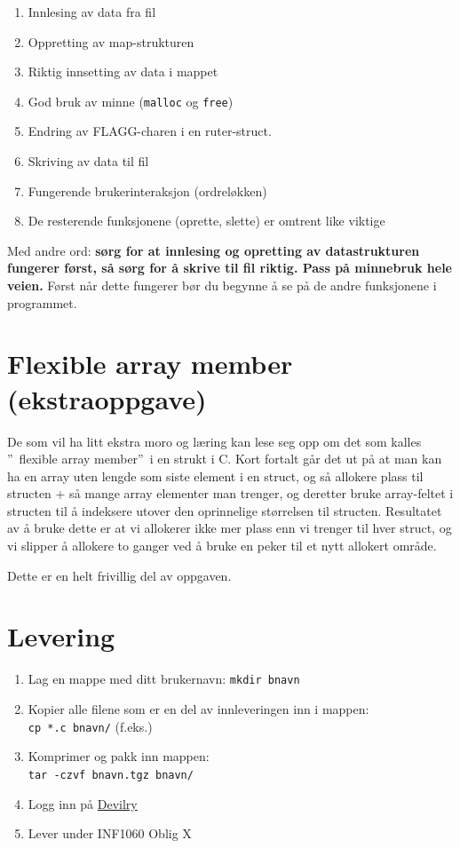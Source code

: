\documentclass[norsk]{article}
\begin{document}
\begin{enumerate}
    \item Innlesing av data fra fil
    \item Oppretting av map-strukturen
    \item Riktig innsetting av data i mappet
    \item God bruk av minne (\texttt{malloc} og \texttt{free})
    \item Endring av FLAGG-charen i en ruter-struct.
    \item Skriving av data til fil
    \item Fungerende brukerinteraksjon (ordreløkken)
    \item De resterende funksjonene (oprette, slette) er omtrent like viktige
\end{enumerate}

Med andre ord: \textbf{sørg for at innlesing og opretting av datastrukturen fungerer først, så sørg for å skrive til fil riktig. Pass på minnebruk hele veien.} Først når dette fungerer bør du begynne å se på de andre funksjonene i programmet.

\section*{Flexible array member (ekstraoppgave)}

De som vil ha litt ekstra moro og læring kan lese seg opp om det som kalles \textquotedblright~flexible array member\textquotedblright~i en strukt i C. Kort fortalt går det ut på at man kan ha en array uten lengde som siste element i en struct, og så allokere plass til structen + så mange array elementer man trenger, og deretter bruke array-feltet i structen til å indeksere utover den oprinnelige størrelsen til structen. Resultatet av å bruke dette er at vi allokerer ikke mer plass enn vi trenger til hver struct, og vi slipper å allokere to ganger ved å bruke en peker til et nytt allokert område.

Dette er en helt frivillig del av oppgaven.

\section*{Levering}

\begin{enumerate}
    \item Lag en mappe med ditt brukernavn: \texttt{mkdir bnavn}
    \item Kopier alle filene som er en del av innleveringen inn i mappen:\\ \texttt{cp *.c bnavn/} (f.eks.)
    \item Komprimer og pakk inn mappen:\\ \texttt{tar -czvf bnavn.tgz bnavn/}
    \item Logg inn på \href{http://devilry.ifi.uio.no}{Devilry}
    \item Lever under INF1060 Oblig X
\end{enumerate}
\end{document}
